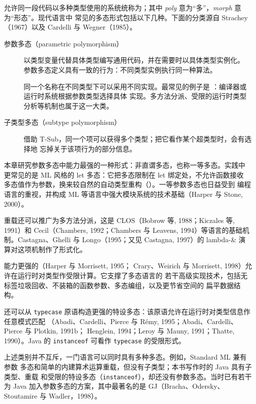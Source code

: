 允许同一段代码以多种类型使用的系统统称为；其中 \emph{poly} 意为“多”，\emph{morph} 意为“形态”。现代语言中
常见的多态形式包括以下几种。下面的分类源自 Strachey（1967）以及 Cardelli 与
Wegner（1985）。

\begin{description}
  \item[参数多态（parametric polymorphism）]
    以类型变量代替具体类型编写通用代码，并在需要时以具体类型实例化。
    参数多态定义具有一致的行为：不同类型实例执行同一种算法。
  \item[]
    同一个名称在不同类型下可以采用不同实现。最常见的例子是
    ：编译器或运行时系统根据参数类型选择具体
    实现。多方法分派、受限的运行时类型分析等机制也属于这一大类。
  \item[子类型多态（subtype polymorphism）]
    借助 T-Sub，同一个项可以获得多个类型；把它看作某个超类型时，会有选择地
    忘掉关于该项行为的部分信息。
\end{description}

本章研究参数多态中能力最强的一种形式：非直谓多态，也称一等多态。实践中
更常见的是 ML 风格的 let 多态：它把多态限制在 let 绑定处，不允许函数接收
多态值作为参数，换来较自然的自动类型重构（）。一等参数多态也日益受到
编程语言的重视，并构成 ML 等语言中强大模块系统的技术基础（Harper 与 Stone, 2000）。

重载还可以推广为多方法分派，这是 CLOS（Bobrow 等, 1988；Kiczales 等, 1991）和
Cecil（Chambers, 1992；Chambers 与 Leavens, 1994）等语言的基础机制。Castagna、Ghelli 与
Longo（1995；又见 Castagna, 1997）的 lambda-\& 演算对这项机制作了形式化。

能力更强的（Harper 与 Morrisett, 1995；
Crary、Weirich 与 Morrisett, 1998）允许在运行时对类型作受限计算。它支撑了多态语言的
若干高级实现技术，包括无标签垃圾回收、不装箱的函数参数、多态编组，以及更节省空间的
扁平数据结构。

还可以从 \texttt{typecase} 原语构造更强的特设多态：该原语允许在运行时对类型信息作任意模式匹配
（Abadi、Cardelli、Pierce 与 Rémy, 1995；Abadi、Cardelli、Pierce 与 Plotkin, 1991b；
Henglein, 1994；Leroy 与 Mauny, 1991；Thatte, 1990）。Java 的 \texttt{instanceof} 可看作
\texttt{typecase} 的受限形式。

上述类别并不互斥，一门语言可以同时具有多种多态。例如，Standard ML 兼有参数
多态和简单的内建算术运算重载，但没有子类型；本书写作时的 Java 具有子类型、重载
和受限的特设多态（\texttt{instanceof}），却还没有参数多态。当时已有若干为 Java
加入参数多态的方案，其中最著名的是 GJ（Bracha、Odersky、Stoutamire 与
Wadler，1998）。

